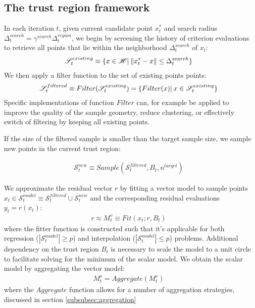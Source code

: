 
\subsection{The trust region framework}
\label{subsec:tr-framework}
In each iteration $t$, given current candidate point $x^*_t$ and search radius $\Delta^{search}_t=\gamma^{search}\Delta_t^{region}$, we begin by screening the history of criterion evaluations to retrieve all points that lie within the neighborhood $\Delta^{search}_t$ of $x_t$:
\begin{align}
    \mathscr{S}^{existing}_t\equiv\{x\in\mathscr{H}|\hspace{0.2em}\lVert x^*_t-x\rVert\leq\Delta^{search}_t\}
    \label{eq:hist-search}
\end{align}
We then apply a filter function to the set of existing points points:
\begin{align}
    \mathscr{S}^{filtered}_t\equiv Filter (\mathscr{S}^{existing}_t) = \{ Filter (x)|\hspace{0.2em} x\in \mathscr{S}^{existing}_t\}
    \label{eq:filtering}
\end{align}
Specific implementations of function $Filter$ can, for example be applied to  improve the quality of the sample geometry, reduce clustering, or effectively switch of filtering by keeping all existing points. 

If the size of the filtered sample is smaller than the target sample size, we sample new points in the current trust region:

\begin{align}
    \mathcal{S}^{new}_{t}\equiv Sample(\mathcal{S}_t^{filtered},B_t,n^{target})
    \label{eq:sample-points}
\end{align}

We approximate the residual vector $r$ by fitting a vector model to sample points $x_t\in\mathcal{S}_t^{model}\equiv\mathcal{S}^{filtered}_t\cup\mathcal{S}^{new}_t$ and the corresponding residual evaluations $y_t=r(x_t)$:
\begin{align}
    r\approx M_t^v\equiv Fit(x_t;r,B_t)
\end{align}
where the fitter function is constructed such that it's applicable for both regression ($|\mathcal{S}^{model}_t|\geq p$) and interpolation ($|\mathcal{S}^{model}_t|\leq p$) problems. Additional dependency on the trust region $B_t$ is necessary to scale the model to a unit circle to facilitate solving for the minimum of the scalar model. We obtain the scalar model by aggregating the vector model:
\begin{align}
    M_t^s = Aggregate(M_t^v)
    \label{eq:aggregate-model}
\end{align}
where the $Aggregate$ function allows for a number of aggregation strategies, discussed in section \ref{subsubsec:aggregation}


